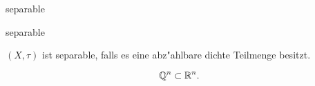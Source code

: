 \documentclass[class=article, crop=false]{standalone}
\begin{document}
\begin{zettel}{separable}
\begin{flashcard}[wfxueo27]{separable}
	\begin{definition}[separable]
		$(X ,\tau )$ ist separable, falls es eine abz"ahlbare dichte Teilmenge besitzt.
	\end{definition}
\end{flashcard}
\begin{example}
	\[
		\mathbb{Q}^n \subset \mathbb{R}^n
	.\]
\end{example}
\end{zettel}
\end{document}
